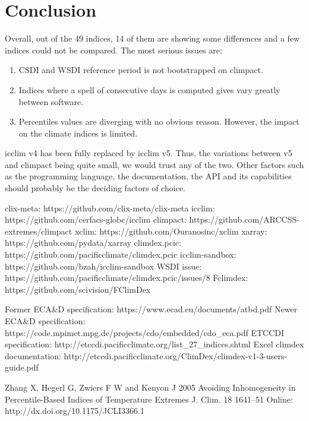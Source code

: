 \documentclass[a4paper,11pt]{article}
\begin{document}
\part{Conclusion}
    Overall, out of the 49 indices, 14 of them are showing some differences and a few indices could not be compared.
    The most serious issues are:
    \begin{enumerate}
        \item CSDI and WSDI reference period is not bootstrapped on climpact.
        \item Indices where a spell of consecutive days is computed gives vary greatly between software.
        \item Percentiles values are diverging with no obvious reason. However, the impact on the climate indices is limited.
    \end{enumerate}

    icclim v4 has been fully replaced by icclim v5.
    Thus, the variations between v5 and climpact being quite small, we would trust any of the two.
    Other factors such as the programming language, the documentation, the API and its capabilities should probably be the deciding factors of choice.


\begin{thebibliography}{10}
        clix-meta: https://github.com/clix-meta/clix-meta
        icclim: https://github.com/cerfacs-globc/icclim
        climpact: https://github.com/ARCCSS-extremes/climpact
        xclim: https://github.com/Ouranosinc/xclim
        xarray: https://github.com/pydata/xarray
        climdex.pcic: https://github.com/pacificclimate/climdex.pcic    
        icclim-sandbox: https://github.com/bzah/icclim-sandbox
        WSDI issue: https://github.com/pacificclimate/climdex.pcic/issues/8
        Fclimdex: https://github.com/scivision/FClimDex
        
        Former ECA\&D specification: https://www.ecad.eu/documents/atbd.pdf
        Newer ECA\&D specification: https://code.mpimet.mpg.de/projects/cdo/embedded/cdo\_eca.pdf
        ETCCDI specification: http://etccdi.pacificclimate.org/list\_27\_indices.shtml
        Excel climdex documentation: http://etccdi.pacificclimate.org/ClimDex/climdex-v1-3-users-guide.pdf

        Zhang X, Hegerl G, Zwiers F W and Kenyon J 2005 Avoiding Inhomogeneity in Percentile-Based Indices of Temperature Extremes J. Clim. 18 1641–51 Online: http://dx.doi.org/10.1175/JCLI3366.1
\end{thebibliography}
\end{document}
